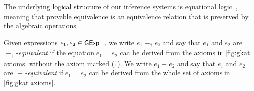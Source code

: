\documentclass[orivec,envcountsect,envcountsame]{llncs}
\begin{document}
%
    \begin{remark}
        The underlying logical structure of our inference systems is equational logic~\cite{birkhoff}, meaning that provable equivalence is an equivalence relation that is preserved by the algebraic operations.
    \end{remark}

    Given expressions \(e_1, e_2 \in \mathsf{GExp}^-\), we write \(e_1 \equiv_\dagger e_2\) and say that \(e_1\) and \(e_2\) are \emph{\(\equiv_\dagger\)-equivalent} if the equation \(e_1 = e_2\) can be derived from the axioms in \cref{fig:gkat axioms} without the axiom marked (\(\dagger\)).
    We write \(e_1 \equiv e_2\) and say that \(e_1\) and \(e_2\) are \emph{\(\equiv\)-equivalent} if \(e_1 = e_2\) can be derived from the whole set of axioms in \cref{fig:gkat axioms}.

\end{document}

